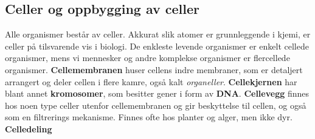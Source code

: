 \documentclass[main.tex]{subfiles}
\begin{document}
\subsection{Celler og oppbygging av celler}
Alle organismer består av celler. Akkurat slik atomer er grunnleggende i kjemi, er celler på tilsvarende vis i biologi. De enkleste levende organismer er enkelt cellede organismer, mens vi mennesker og andre komplekse organismer er flercellede organismer.
\newline\newline
\textbf{Cellemembranen} huser cellens indre membraner, som er detaljert arrangert og deler cellen i flere kamre, også kalt \emph{organeller}.
\newline\newline
\textbf{Cellekjernen} har blant annet \textbf{kromosomer}, som besitter gener i form av \textbf{DNA}.
\newline\newline
\textbf{Cellevegg} finnes hos noen type celler utenfor cellemembranen og gir beskyttelse til cellen, og også som en filtrerings mekanisme. Finnes ofte hos planter og alger, men ikke dyr.
\newline\newline
\textbf{Celledeling}
\end{document}
